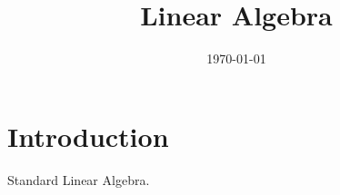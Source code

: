 \documentclass{article}
\title{Linear Algebra}
\date{\today}
\begin{document}
\maketitle
\tableofcontents

\section{Introduction}
Standard Linear Algebra.



\end{document}
